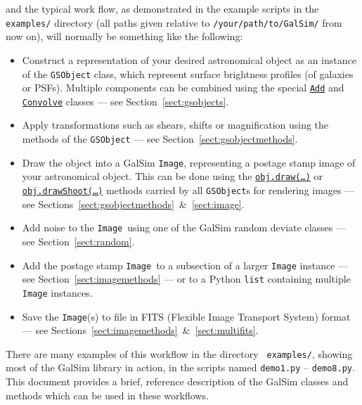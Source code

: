 \documentclass[preprint,11pt]{aastex}
\begin{document}
and the typical work flow, as demonstrated in the example scripts in the {\tt
examples/} directory (all paths given relative to
\texttt{/your/path/to/GalSim/} from now on), will normally
be something like the following:
\begin{itemize}

\item Construct a representation of your desired astronomical object
  as an instance of the {\tt GSObject} class, which represent surface brightness profiles (of galaxies or PSFs).  Multiple components can be
  combined using the special
  \href{http://galsim-developers.github.com/GalSim/classgalsim_1_1base_1_1_add.html}{\texttt{Add}}
  and 
  \href{http://galsim-developers.github.com/GalSim/classgalsim_1_1base_1_1_convolve.html}{\texttt{Convolve}}
  classes --- see Section~\ref{sect:gsobjects}.
\item Apply transformations such as shears, shifts or magnification
  using the methods of the \texttt{GSObject} --- see Section~\ref{sect:gsobjectmethods}.
\item Draw the object into a GalSim \texttt{Image}, representing a postage
  stamp image of your astronomical object.  This can be done using the
  \href{http://galsim-developers.github.com/GalSim/classgalsim_1_1base_1_1_g_s_object.html#ae0b346a8b438dedbc7f60a52220869d8}{\texttt{obj.draw(\dots)}}
  or
  \href{http://galsim-developers.github.com/GalSim/classgalsim_1_1base_1_1_g_s_object.html#a42ac334d2840ba3fa832988e998beca0}{\texttt{obj.drawShoot(\dots)}}
  methods carried by all \texttt{GSObject}s for rendering images --- see
  Sections~\ref{sect:gsobjectmethods}~\&~\ref{sect:image}.
\item Add noise to the \texttt{Image}~using one of the GalSim
  random deviate classes --- see Section~\ref{sect:random}.
\item Add the postage stamp \texttt{Image}~to a subsection of a larger
  \texttt{Image} 
  instance --- see
  Section~\ref{sect:imagemethods} --- or to a Python
  \texttt{list} containing multiple \texttt{Image} instances.
\item Save the \texttt{Image}(s) to file in FITS (Flexible Image Transport
  System) format --- see Sections~\ref{sect:imagemethods}~\&~\ref{sect:multifits}.
\end{itemize}

There are many examples of this workflow in the directory {\tt
 examples/}, showing most of the GalSim library in action, in
the scripts named \texttt{demo1.py} -- \texttt{demo8.py}.  This
document provides a brief, reference description of the GalSim classes
and methods which can be used in these workflows.
\end{document}
